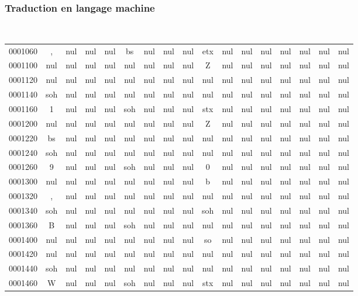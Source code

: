 \begin{frame}[fragile]
\frametitle{Traduction en langage machine}
{\tt \footnotesize
\setlength{\tabcolsep}{.07cm}
\begin{tabular}{ccccccccccccccccc}
0001060 &, &nul &nul &nul &bs &nul &nul &nul &etx &nul &nul &nul &nul &nul &nul &nul \\
0001100 &nul &nul &nul &nul &nul &nul &nul &nul &Z &nul &nul &nul &nul &nul &nul &nul \\
0001120 &nul &nul &nul &nul &nul &nul &nul &nul &nul &nul &nul &nul &nul &nul &nul &nul \\
0001140 &soh &nul &nul &nul &nul &nul &nul &nul &nul &nul &nul &nul &nul &nul &nul &nul \\
0001160 &1 &nul &nul &nul &soh &nul &nul &nul &stx &nul &nul &nul &nul &nul &nul &nul \\
0001200 &nul &nul &nul &nul &nul &nul &nul &nul &Z &nul &nul &nul &nul &nul &nul &nul \\
0001220 &bs &nul &nul &nul &nul &nul &nul &nul &nul &nul &nul &nul &nul &nul &nul &nul \\
0001240 &soh &nul &nul &nul &nul &nul &nul &nul &nul &nul &nul &nul &nul &nul &nul &nul \\
0001260 &9 &nul &nul &nul &soh &nul &nul &nul &0 &nul &nul &nul &nul &nul &nul &nul \\
0001300 &nul &nul &nul &nul &nul &nul &nul &nul &b &nul &nul &nul &nul &nul &nul &nul \\
0001320 &, &nul &nul &nul &nul &nul &nul &nul &nul &nul &nul &nul &nul &nul &nul &nul \\
0001340 &soh &nul &nul &nul &nul &nul &nul &nul &soh &nul &nul &nul &nul &nul &nul &nul \\
0001360 &B &nul &nul &nul &soh &nul &nul &nul &nul &nul &nul &nul &nul &nul &nul &nul \\
0001400 &nul &nul &nul &nul &nul &nul &nul &nul &so &nul &nul &nul &nul &nul &nul &nul \\
0001420 &nul &nul &nul &nul &nul &nul &nul &nul &nul &nul &nul &nul &nul &nul &nul &nul \\
0001440 &soh &nul &nul &nul &nul &nul &nul &nul &nul &nul &nul &nul &nul &nul &nul &nul \\
0001460 &W &nul &nul &nul &soh &nul &nul &nul &stx &nul &nul &nul &nul &nul &nul &nul \\
\end{tabular}}
\end{frame}

